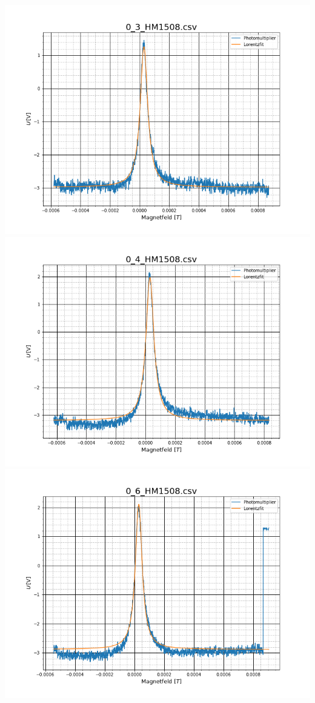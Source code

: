 \includegraphics[scale=0.3]{Bild/Anhang/Abkuhlung_2/abk_2_04}\\
\includegraphics[scale=0.3]{Bild/Anhang/Abkuhlung_2/abk_2_05}
\includegraphics[scale=0.3]{Bild/Anhang/Abkuhlung_2/abk_2_06}

